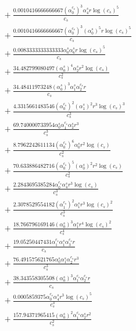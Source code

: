 \documentclass[10pt]{article}
\begin{document}
\begin{align*}
&{}  + \frac{0.0010416666666667 \left(\alpha_{0}^{c_s}\right)^{3} \alpha_{4}^s r \log{\left(c_{s} \right)}^{5}}{c_{s}} \\
&{}  + \frac{0.0010416666666667 \left(\alpha_{0}^{c_s}\right)^{3} \left(\alpha_{0}^s\right)^{5} r \log{\left(c_{s} \right)}^{5}}{c_{s}} \\
&{}  + \frac{0.0083333333333333 \alpha_{0}^s \alpha_{6}^s r \log{\left(c_{s} \right)}^{5}}{c_{s}} \\
&{}  + \frac{34.482799080497 \left(\alpha_{0}^s\right)^{4} \alpha_{2}^s r^{2} \log{\left(c_{s} \right)}}{c_{s}^{2}} \\
&{}  + \frac{34.48411973248 \left(\alpha_{0}^s\right)^{3} \alpha_{1}^s \alpha_{2}^{c_s} r}{c_{s}} \\
&{}  + \frac{4.3315661483546 \left(\alpha_{0}^{c_s}\right)^{2} \left(\alpha_{1}^s\right)^{2} r^{3} \log{\left(c_{s} \right)}^{3}}{c_{s}^{3}} \\
&{}  + \frac{69.740000733954 \alpha_{0}^s \alpha_{1}^{c_s} \alpha_{2}^s r^{3}}{c_{s}^{3}} \\
&{}  + \frac{8.7962242611134 \left(\alpha_{0}^{c_s}\right)^{6} \alpha_{0}^s r^{2} \log{\left(c_{s} \right)}}{c_{s}^{2}} \\
&{}  + \frac{70.633886482716 \left(\alpha_{0}^{c_s}\right)^{5} \left(\alpha_{0}^s\right)^{2} r^{2} \log{\left(c_{s} \right)}}{c_{s}^{2}} \\
&{}  + \frac{2.2843695385284 \alpha_{0}^{c_s} \alpha_{4}^s r^{3} \log{\left(c_{s} \right)}}{c_{s}^{3}} \\
&{}  + \frac{2.3078529554182 \left(\alpha_{1}^{c_s}\right)^{2} \alpha_{1}^s r^{3} \log{\left(c_{s} \right)}^{2}}{c_{s}^{3}} \\
&{}  + \frac{18.766796169146 \left(\alpha_{0}^s\right)^{3} \alpha_{1}^s r^{4} \log{\left(c_{s} \right)}^{2}}{c_{s}^{4}} \\
&{}  + \frac{19.05250447431 \alpha_{1}^{c_s} \alpha_{1}^s \alpha_{3}^{c_s} r}{c_{s}} \\
&{}  + \frac{76.491575621765 \alpha_{0}^s \alpha_{1}^s \alpha_{2}^{c_s} r^{3}}{c_{s}^{3}} \\
&{}  + \frac{38.343558305508 \left(\alpha_{0}^s\right)^{3} \alpha_{1}^{c_s} \alpha_{2}^{c_s} r}{c_{s}} \\
&{}  + \frac{0.0005859375 \alpha_{0}^{c_s} \alpha_{4}^s r^{3} \log{\left(c_{s} \right)}^{5}}{c_{s}^{3}} \\
&{}  + \frac{157.94371965415 \left(\alpha_{0}^s\right)^{2} \alpha_{1}^{c_s} \alpha_{2}^s r^{2}}{c_{s}^{2}} \\

\end{align*}
\end{document}
